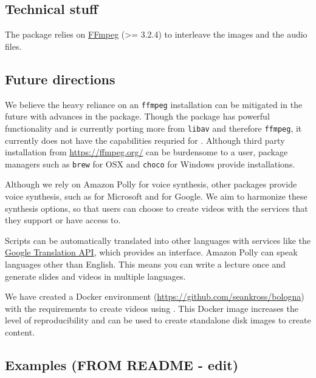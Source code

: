 \hypertarget{technical-stuff}{%
\subsection{Technical stuff}\label{technical-stuff}}

The  package relies on \href{https://ffmpeg.org/}{FFmpeg}
(\textgreater{}= 3.2.4) to interleave the images and the audio files.

\hypertarget{future-directions}{%
\subsection{Future directions}\label{future-directions}}

We believe the heavy reliance on an \texttt{ffmpeg} installation can be
mitigated in the future with advances in the  package. Though
the  package has powerful functionality and is currently porting
more from \texttt{libav} and therefore \texttt{ffmpeg}, it currently
does not have the capabilities requried for . Although third
party installation from \url{https://ffmpeg.org/} can be burdensome to a
user, package managers such as \texttt{brew} for OSX and \texttt{choco}
for Windows provide installations.

Although we rely on Amazon Polly for voice synthesis, other packages
provide voice synthesis, such as  for Microsoft and
 for Google. We aim to harmonize these
synthesis options, so that users can choose to create videos with the
services that they support or have access to.

Scripts can be automatically translated into other languages with
services like the \href{https://cloud.google.com/translate/docs/}{Google
Translation API}, which  provides an interface.
Amazon Polly can speak languages other than English. This means you can
write a lecture once and generate slides and videos in multiple
languages.

We have created a Docker environment
(\url{https://github.com/seankross/bologna}) with the requirements to
create videos using . This Docker image increases the level of
reproducibility and can be used to create standalone disk images to
create content.

\hypertarget{examples-from-readme---edit}{%
\subsection{Examples (FROM README -
edit)}\label{examples-from-readme---edit}}

